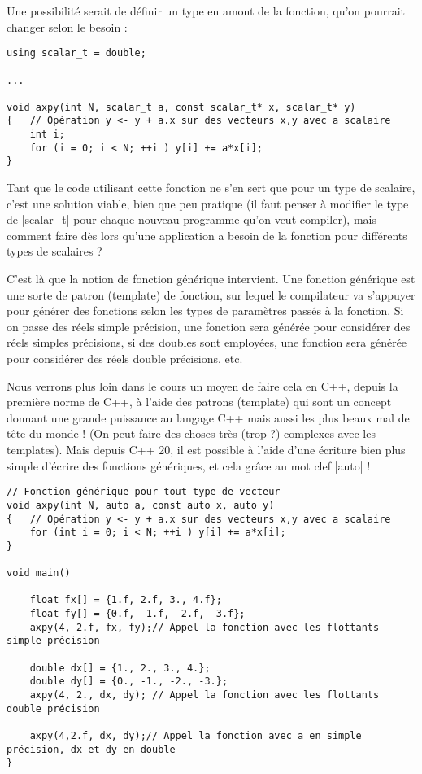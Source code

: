 Une possibilité serait de définir un type en amont de la fonction, qu'on pourrait changer selon le besoin :
\begin{lstlisting}
using scalar_t = double;

...

void axpy(int N, scalar_t a, const scalar_t* x, scalar_t* y)
{   // Opération y <- y + a.x sur des vecteurs x,y avec a scalaire
    int i;
    for (i = 0; i < N; ++i ) y[i] += a*x[i];
}
\end{lstlisting}

Tant que le code utilisant cette fonction ne s'en sert que pour un type de scalaire, c'est une solution viable, bien que peu pratique (il faut penser à modifier le type de |scalar_t| pour chaque nouveau programme qu'on veut compiler), mais comment faire dès lors qu'une application a besoin de la fonction pour différents types de scalaires ?

C'est là que la notion de fonction générique intervient. Une fonction générique est une sorte de patron (template) de fonction, sur lequel le compilateur va s'appuyer pour générer des fonctions selon les types de paramètres passés à la fonction. Si on passe des réels simple précision, une fonction sera générée pour considérer des réels simples précisions,
si des doubles sont employées, une fonction sera générée pour considérer des réels double précisions, etc.

Nous verrons plus loin dans le cours un moyen de faire cela en C++, depuis la première norme de C++, à l'aide des patrons (template) qui sont un concept donnant une grande puissance au langage C++ mais aussi les plus beaux mal de tête du monde ! (On peut faire des choses très (trop ?) complexes avec les templates). Mais depuis C++ 20, il est possible
à l'aide d'une écriture bien plus simple d'écrire des fonctions génériques, et cela grâce
au mot clef |auto| !

\begin{lstlisting}[caption=utilisation du mot clef auto pour déclarer les paramètres de la fonction]
// Fonction générique pour tout type de vecteur
void axpy(int N, auto a, const auto x, auto y)
{   // Opération y <- y + a.x sur des vecteurs x,y avec a scalaire
    for (int i = 0; i < N; ++i ) y[i] += a*x[i];
}

void main()

    float fx[] = {1.f, 2.f, 3., 4.f};
    float fy[] = {0.f, -1.f, -2.f, -3.f};
    axpy(4, 2.f, fx, fy);// Appel la fonction avec les flottants simple précision

    double dx[] = {1., 2., 3., 4.};
    double dy[] = {0., -1., -2., -3.};
    axpy(4, 2., dx, dy); // Appel la fonction avec les flottants double précision

    axpy(4,2.f, dx, dy);// Appel la fonction avec a en simple précision, dx et dy en double
}
\end{lstlisting}

